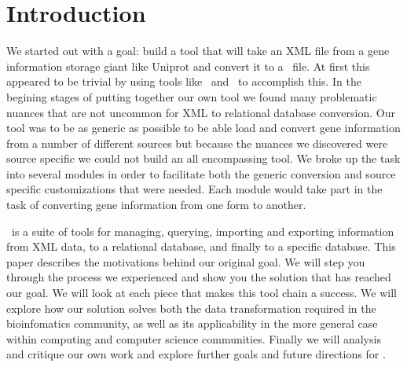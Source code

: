 \section{Introduction}
We started out with a goal: build a tool that will take an XML file from a gene information storage giant like Uniprot and convert it to a \Genmapp~file. At first this appeared to be trivial by using tools like ~and \Hibernate~to accomplish this. In the begining stages of putting together our own tool we found many problematic nuances that are not uncommon for XML to relational database conversion. Our tool was to be as generic as possible to be able load and convert gene information from a number of different sources but because the nuances we discovered were source specific we could not build an all encompassing tool. We broke up the task into several modules in order to facilitate both the generic conversion and source specific customizations that were needed.  Each module would take part in the task of converting gene information from one form to another.

\xmlpipedb~is a suite of tools for managing, querying, importing and exporting information from XML data, to a relational database, and finally to a \Genmapp specific database. This paper describes the motivations behind our original goal.  We will step you through the process we experienced and show you the solution that has reached our goal. We will look at each piece that makes this tool chain a success.  We will explore how our solution solves both the data transformation required in the bioinfomatics community, as well as its applicability in the more general case within computing and computer science communities.  Finally we will analysis and critique our own work and explore further goals and future directions for \xmlpipedb.
